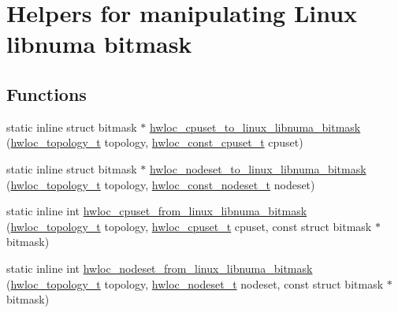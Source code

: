 \hypertarget{a00069}{
\section{Helpers for manipulating Linux libnuma bitmask}
\label{a00069}
}
\subsection*{Functions}
\begin{DoxyCompactItemize}
\item 
static inline struct bitmask $\ast$ \hyperlink{a00069_ga1a2ad777b9b4cf4aac0123f61c3ab8bd}{hwloc\_\-cpuset\_\-to\_\-linux\_\-libnuma\_\-bitmask} (\hyperlink{a00039_ga9d1e76ee15a7dee158b786c30b6a6e38}{hwloc\_\-topology\_\-t} topology, \hyperlink{a00040_ga1f784433e9b606261f62d1134f6a3b25}{hwloc\_\-const\_\-cpuset\_\-t} cpuset) 
\item 
static inline struct bitmask $\ast$ \hyperlink{a00069_gab67a395c48ddb56307b1465fab9bb9e6}{hwloc\_\-nodeset\_\-to\_\-linux\_\-libnuma\_\-bitmask} (\hyperlink{a00039_ga9d1e76ee15a7dee158b786c30b6a6e38}{hwloc\_\-topology\_\-t} topology, \hyperlink{a00040_ga2f5276235841ad66a79bedad16a5a10c}{hwloc\_\-const\_\-nodeset\_\-t} nodeset) 
\item 
static inline int \hyperlink{a00069_ga47747968f12c2674d2840dfbacce4940}{hwloc\_\-cpuset\_\-from\_\-linux\_\-libnuma\_\-bitmask} (\hyperlink{a00039_ga9d1e76ee15a7dee158b786c30b6a6e38}{hwloc\_\-topology\_\-t} topology, \hyperlink{a00040_ga4bbf39b68b6f568fb92739e7c0ea7801}{hwloc\_\-cpuset\_\-t} cpuset, const struct bitmask $\ast$bitmask)
\item 
static inline int \hyperlink{a00069_ga5a1d17375cc7b65cd155330008cbdb6a}{hwloc\_\-nodeset\_\-from\_\-linux\_\-libnuma\_\-bitmask} (\hyperlink{a00039_ga9d1e76ee15a7dee158b786c30b6a6e38}{hwloc\_\-topology\_\-t} topology, \hyperlink{a00040_ga37e35730fa7e775b5bb0afe893d6d508}{hwloc\_\-nodeset\_\-t} nodeset, const struct bitmask $\ast$bitmask)
\end{DoxyCompactItemize}


